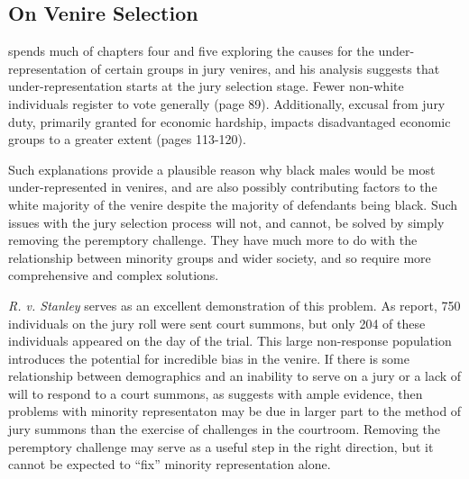\subsection{On Venire Selection}

\cite{vandykejurysel} spends much of chapters four and five exploring the causes for the under-representation of certain groups in
jury venires, and his analysis suggests that under-representation
starts at the jury selection stage. Fewer non-white
individuals register to vote generally (page 89). Additionally,
excusal from jury duty, primarily granted for economic
hardship, impacts disadvantaged economic groups to a greater extent (pages 113-120).

Such explanations provide a plausible reason why black males would be
most under-represented in venires, and are also possibly contributing
factors to the white majority of the venire despite the majority of defendants being black. Such issues with the jury
selection process will not, and cannot, be solved by simply removing the peremptory challenge. They have much more to do with the
relationship between minority groups and wider society, and so require more comprehensive and complex solutions.

\textit{R. v. Stanley} serves as an excellent demonstration of this problem. As \cite{boushie750} report, 750 individuals on the
jury roll were sent court summons, but only 204 of these individuals appeared on the day of the trial. This large non-response
population introduces the potential for incredible bias in the venire. If there is some
relationship between demographics and an inability to serve on a jury or a lack of will to respond to a court summons, as
\cite{vandykejurysel} suggests with ample evidence, then problems with minority representaton may be due in larger part to the
method of jury summons than the exercise of challenges in the courtroom. Removing the peremptory challenge may serve as a useful
step in the right direction, but it cannot be expected to ``fix'' minority representation alone.